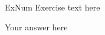 \documentclass{seastaralgebras_hw}
\date{\today} %
\begin{document}
\maketitle



\begin{exercise}{ExNum}
Exercise text here
\end{exercise}
\begin{solution}
Your answer here
\end{solution}
\end{document}
